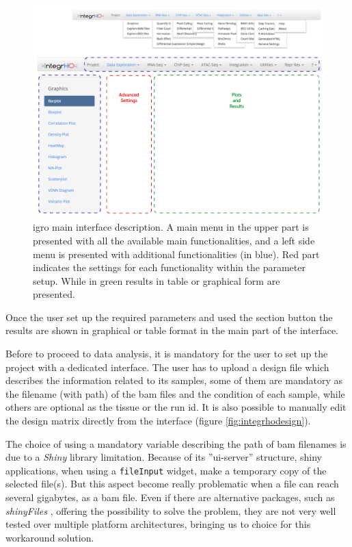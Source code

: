 \begin{figure}[H]
\centering
\includegraphics[width=\textwidth, keepaspectratio]{img/integrho/interface.png}
\caption[\gls{igro} main interface]{\gls{igro} main interface description. A main menu in the upper part is presented with all the available main functionalities, and a left side menu is presented with additional functionalities (in blue). Red part indicates the settings for each functionality within the parameter setup. While in green results in table or graphical form are presented.}
\label{fig:integrhomain}
\end{figure}

Once the user set up the required parameters and used the section button the results are shown in graphical or table format in the main part of the interface.

Before to proceed to data analysis, it is mandatory for the user to set up the project with a dedicated interface. 
The user has to upload a design file which describes the information related to its samples, some of them are mandatory as the filename (with path) of the \gls{bam} files and the condition of each sample, while others are optional as the tissue or the run id. 
It is also possible to manually edit the design matrix directly from the interface (figure \ref{fig:integrhodesign}).

The choice of using a mandatory variable describing the path of  \gls{bam} filenames is due to a \textit{Shiny} library limitation. 
Because of its ''ui-server'' structure, shiny applications, when using a \lstinline!fileInput! widget, make a temporary copy of the selected file(s).
But this aspect become really problematic when a file can reach several gigabytes, as a  \gls{bam} file.
Even if there are alternative packages, such as \textit{shinyFiles} \cite{shinyFiles}, offering the possibility to solve the problem, they are not very well tested over multiple platform architectures, bringing us to choice for this workaround solution.


